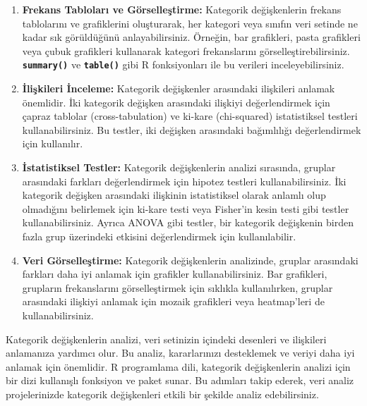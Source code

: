 \documentclass[
  letterpaper,
  DIV=11,
  numbers=noendperiod]{scrreprt}
\newenvironment{Shaded}{\begin{snugshade}}{\end{snugshade}}
\newcommand{\CommentTok}[1]{\textcolor[rgb]{0.37,0.37,0.37}{#1}}
\newcommand{\FunctionTok}[1]{\textcolor[rgb]{0.28,0.35,0.67}{#1}}
\newcommand{\NormalTok}[1]{\textcolor[rgb]{0.00,0.23,0.31}{#1}}
\newcommand{\SpecialCharTok}[1]{\textcolor[rgb]{0.37,0.37,0.37}{#1}}
\begin{document}
\begin{enumerate}
\def\labelenumi{\arabic{enumi}.}
\item
  \textbf{Frekans Tabloları ve Görselleştirme:} Kategorik değişkenlerin
  frekans tablolarını ve grafiklerini oluşturarak, her kategori veya
  sınıfın veri setinde ne kadar sık görüldüğünü anlayabilirsiniz.
  Örneğin, bar grafikleri, pasta grafikleri veya çubuk grafikleri
  kullanarak kategori frekanslarını görselleştirebilirsiniz.
  \textbf{\texttt{summary()}} ve \textbf{\texttt{table()}} gibi R
  fonksiyonları ile bu verileri inceleyebilirsiniz.
\item
  \textbf{İlişkileri İnceleme:} Kategorik değişkenler arasındaki
  ilişkileri anlamak önemlidir. İki kategorik değişken arasındaki
  ilişkiyi değerlendirmek için çapraz tablolar (cross-tabulation) ve
  ki-kare (chi-squared) istatistiksel testleri kullanabilirsiniz. Bu
  testler, iki değişken arasındaki bağımlılığı değerlendirmek için
  kullanılır.
\item
  \textbf{İstatistiksel Testler:} Kategorik değişkenlerin analizi
  sırasında, gruplar arasındaki farkları değerlendirmek için hipotez
  testleri kullanabilirsiniz. İki kategorik değişken arasındaki
  ilişkinin istatistiksel olarak anlamlı olup olmadığını belirlemek için
  ki-kare testi veya Fisher'in kesin testi gibi testler
  kullanabilirsiniz. Ayrıca ANOVA gibi testler, bir kategorik değişkenin
  birden fazla grup üzerindeki etkisini değerlendirmek için
  kullanılabilir.
\item
  \textbf{Veri Görselleştirme:} Kategorik değişkenlerin analizinde,
  gruplar arasındaki farkları daha iyi anlamak için grafikler
  kullanabilirsiniz. Bar grafikleri, grupların frekanslarını
  görselleştirmek için sıklıkla kullanılırken, gruplar arasındaki
  ilişkiyi anlamak için mozaik grafikleri veya heatmap'leri de
  kullanabilirsiniz.
\end{enumerate}

Kategorik değişkenlerin analizi, veri setinizin içindeki desenleri ve
ilişkileri anlamanıza yardımcı olur. Bu analiz, kararlarınızı
desteklemek ve veriyi daha iyi anlamak için önemlidir. R programlama
dili, kategorik değişkenlerin analizi için bir dizi kullanışlı fonksiyon
ve paket sunar. Bu adımları takip ederek, veri analiz projelerinizde
kategorik değişkenleri etkili bir şekilde analiz edebilirsiniz.

\begin{Shaded}
\end{Shaded}
\end{document}
